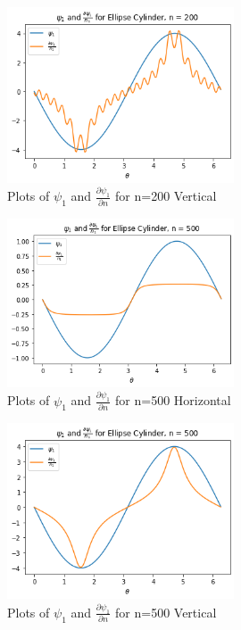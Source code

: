 \documentclass{article}
\begin{document}
		\begin{figure}[H]
			\centering
			\includegraphics[width=0.6\textwidth]{images/el2002.png}
			\caption{ Plots of $\psi_1$ and $\frac{\partial \psi_1}{\partial n}$ for n=200 Vertical}
		\end{figure}
	
		\begin{figure}[H]
			\centering
			\includegraphics[width=0.6\textwidth]{images/el5001.png}
			\caption{ Plots of $\psi_1$ and $\frac{\partial \psi_1}{\partial n}$ for n=500 Horizontal}
		\end{figure}
		
		\begin{figure}[H]
			\centering
			\includegraphics[width=0.6\textwidth]{images/el5002.png}
			\caption{ Plots of $\psi_1$ and $\frac{\partial \psi_1}{\partial n}$ for n=500 Vertical}
		\end{figure}
	
\end{document}
